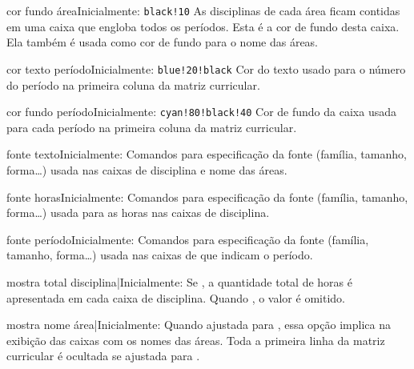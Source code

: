\documentclass[a4paper, 11pt]{article}
\begin{document}
\begin{Optiondef}{cor fundo área}{}{Inicialmente: \texttt{black!10}}
    As disciplinas de cada área ficam contidas em uma caixa que engloba todos os períodos. Esta é a cor de fundo desta caixa. Ela também é usada como cor de fundo para o nome das áreas.
\end{Optiondef}

\begin{Optiondef}{cor texto período}{}{Inicialmente: \texttt{blue!20!black}}
    Cor do texto usado para o número do período na primeira coluna da matriz curricular.
\end{Optiondef}

\begin{Optiondef}{cor fundo período}{}{Inicialmente: \texttt{cyan!80!black!40}}
    Cor de fundo da caixa usada para cada período na primeira coluna da matriz curricular.
\end{Optiondef}

\begin{Optiondef}{fonte texto}{}{Inicialmente: \PDInline{\sffamily\bfseries\small}}
    Comandos para especificação da fonte (família, tamanho, forma\ldots) usada nas caixas de disciplina e nome das áreas.
\end{Optiondef}

\begin{Optiondef}{fonte horas}{}{Inicialmente: \PDInline{\sffamily\bfseries\small}}
    Comandos para especificação da fonte (família, tamanho, forma\ldots) usada para as horas nas caixas de disciplina.
\end{Optiondef}

\begin{Optiondef}{fonte período}{}{Inicialmente: \PDInline{\sffamily\bfseries\LARGE}}
    Comandos para especificação da fonte (família, tamanho, forma\ldots) usada nas caixas de que indicam o período.
\end{Optiondef}

\begin{Optiondef}{mostra total disciplina}{|}{Inicialmente: }
    Se , a quantidade total de horas é apresentada em cada caixa de disciplina. Quando , o valor é omitido.
\end{Optiondef}

\begin{Optiondef}{mostra nome área}{|}{Inicialmente: }
    Quando ajustada para , essa opção implica na exibição das caixas com os nomes das áreas. Toda a primeira linha da matriz curricular é ocultada se ajustada para .
\end{Optiondef}
\end{document}
